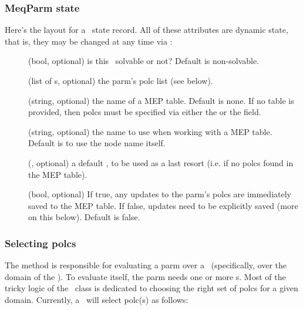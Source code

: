 \documentclass[10pt]{article}
\begin{document}
\subsubsection{MeqParm state}

  Here's the layout for a \Parm\ state record. All of these attributes are
  dynamic state, that is, they may be changed at any time via :
  
  \begin{description}

  \item[] (bool, optional) is this \Parm\ solvable or not?
    Default is non-solvable.

  \item[] (list of \Polc{}s, optional) the parm's polc list (see below).

  \item[] (string, optional) the name of a MEP table. Default is none.
    If no table is provided, then polcs must be specified via either the
     or the  field.

  \item[] (string, optional) the name to use when working with a MEP
    table. Default is to use the node name itself.

  \item[] (\Polc, optional) a default \Polc, to be used as a last
    resort (i.e. if no polcs found in the MEP table).

  \item[] (bool, optional) If true, any updates to the parm's 
    polcs are immediately saved to the MEP table. If false, updates need to be
    explicitly saved (more on this below). Default is false.

  \end{description}
  
\subsubsection{Selecting polcs}

  The  method is responsible for evaluating a parm over a
  \Cells\ (specifically, over the domain of the \Cells). To evaluate itself,
  the parm needs one or more \Polc{}s. Most of the tricky logic of the \Parm\
  class is dedicated to choosing the right set of polcs for a given domain. 
  Currently, a \Parm\ will select polc(s) as follows:
\end{document}
